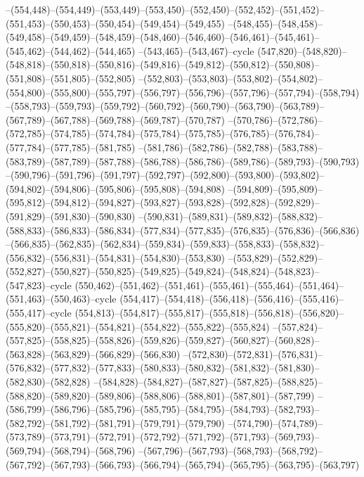 --(554,448)--(554,449)--(553,449)--(553,450)--(552,450)--(552,452)--(551,452)--(551,453)--(550,453)--(550,454)--(549,454)--(549,455)
--(548,455)--(548,458)--(549,458)--(549,459)--(548,459)--(548,460)--(546,460)--(546,461)--(545,461)--(545,462)--(544,462)--(544,465)
--(543,465)--(543,467)--cycle
(547,820)--(548,820)--(548,818)--(550,818)--(550,816)--(549,816)--(549,812)--(550,812)--(550,808)--(551,808)--(551,805)--(552,805)
--(552,803)--(553,803)--(553,802)--(554,802)--(554,800)--(555,800)--(555,797)--(556,797)--(556,796)--(557,796)--(557,794)--(558,794)
--(558,793)--(559,793)--(559,792)--(560,792)--(560,790)--(563,790)--(563,789)--(567,789)--(567,788)--(569,788)--(569,787)--(570,787)
--(570,786)--(572,786)--(572,785)--(574,785)--(574,784)--(575,784)--(575,785)--(576,785)--(576,784)--(577,784)--(577,785)--(581,785)
--(581,786)--(582,786)--(582,788)--(583,788)--(583,789)--(587,789)--(587,788)--(586,788)--(586,786)--(589,786)--(589,793)--(590,793)
--(590,796)--(591,796)--(591,797)--(592,797)--(592,800)--(593,800)--(593,802)--(594,802)--(594,806)--(595,806)--(595,808)--(594,808)
--(594,809)--(595,809)--(595,812)--(594,812)--(594,827)--(593,827)--(593,828)--(592,828)--(592,829)--(591,829)--(591,830)--(590,830)
--(590,831)--(589,831)--(589,832)--(588,832)--(588,833)--(586,833)--(586,834)--(577,834)--(577,835)--(576,835)--(576,836)--(566,836)
--(566,835)--(562,835)--(562,834)--(559,834)--(559,833)--(558,833)--(558,832)--(556,832)--(556,831)--(554,831)--(554,830)--(553,830)
--(553,829)--(552,829)--(552,827)--(550,827)--(550,825)--(549,825)--(549,824)--(548,824)--(548,823)--(547,823)--cycle
(550,462)--(551,462)--(551,461)--(555,461)--(555,464)--(551,464)--(551,463)--(550,463)--cycle
(554,417)--(554,418)--(556,418)--(556,416)--(555,416)--(555,417)--cycle
(554,813)--(554,817)--(555,817)--(555,818)--(556,818)--(556,820)--(555,820)--(555,821)--(554,821)--(554,822)--(555,822)--(555,824)
--(557,824)--(557,825)--(558,825)--(558,826)--(559,826)--(559,827)--(560,827)--(560,828)--(563,828)--(563,829)--(566,829)--(566,830)
--(572,830)--(572,831)--(576,831)--(576,832)--(577,832)--(577,833)--(580,833)--(580,832)--(581,832)--(581,830)--(582,830)--(582,828)
--(584,828)--(584,827)--(587,827)--(587,825)--(588,825)--(588,820)--(589,820)--(589,806)--(588,806)--(588,801)--(587,801)--(587,799)
--(586,799)--(586,796)--(585,796)--(585,795)--(584,795)--(584,793)--(582,793)--(582,792)--(581,792)--(581,791)--(579,791)--(579,790)
--(574,790)--(574,789)--(573,789)--(573,791)--(572,791)--(572,792)--(571,792)--(571,793)--(569,793)--(569,794)--(568,794)--(568,796)
--(567,796)--(567,793)--(568,793)--(568,792)--(567,792)--(567,793)--(566,793)--(566,794)--(565,794)--(565,795)--(563,795)--(563,797)
